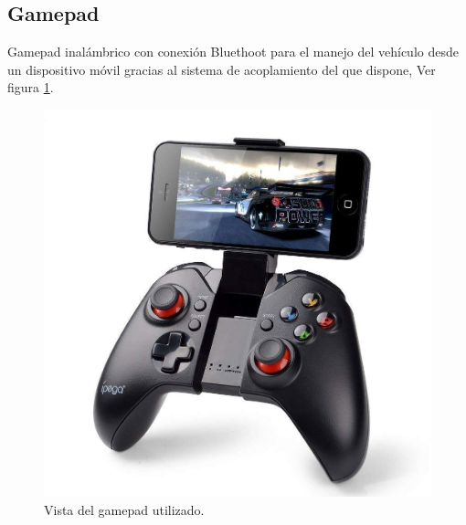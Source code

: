 \subsection{Gamepad}

Gamepad inalámbrico con conexión Bluethoot para el manejo del vehículo desde un dispositivo móvil gracias al sistema de acoplamiento del que dispone, Ver figura \ref{figura:control_pad}.

\begin{figure}[H]
  \begin{center}
    \includegraphics[scale=0.18]{imagenes/robot/control_pad.jpg}
  \end{center}
  \caption{Vista del gamepad utilizado.}
  \label{figura:control_pad}
\end{figure}